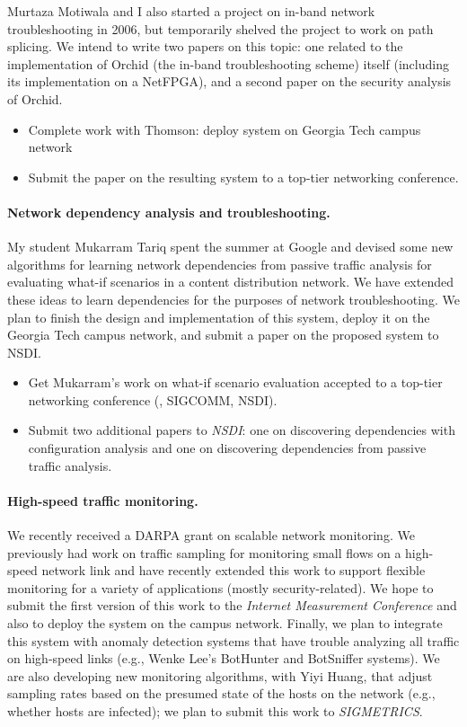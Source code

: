 \begin{sloppypar}
Murtaza Motiwala and I also started a project on in-band network
troubleshooting in 2006, but temporarily shelved the project to work on
path splicing.  We intend to write two papers on this topic: one related
to the implementation of Orchid (the in-band troubleshooting scheme)
itself (including its implementation on a NetFPGA), and a second paper
on the security analysis of Orchid.

\begin{itemize}
\itemsep=-1pt
\item Complete work with Thomson: deploy system on Georgia Tech campus
  network
\item Submit the paper on the resulting system to a top-tier networking
  conference. 
\end{itemize}

\paragraph{Network dependency analysis and troubleshooting.}  My student
Mukarram Tariq spent the summer at Google and devised some new
algorithms for learning network dependencies from passive traffic
analysis for evaluating what-if scenarios in a content distribution
network.  We have extended these ideas to learn dependencies for the
purposes of network troubleshooting.  We plan to finish the design and
implementation of this system, deploy it on the Georgia Tech campus
network, and submit a paper on the proposed system to NSDI.

\begin{itemize}
\itemsep=-1pt
\item Get Mukarram's work on what-if scenario evaluation accepted to a
  top-tier networking conference (\eg, SIGCOMM, NSDI).
\item Submit two additional papers to {\em NSDI}: one on discovering
  dependencies with configuration analysis and one on discovering
  dependencies from passive traffic analysis.
\end{itemize}

\paragraph{High-speed traffic monitoring.} We recently received a DARPA
grant on scalable network monitoring.  We previously had work on traffic
sampling for monitoring small flows on a high-speed network link and
have recently extended this work to support flexible monitoring for a
variety of applications (mostly security-related).  We hope to submit
the first version of this work to the {\em Internet Measurement
Conference} and also to deploy the system on the campus network.
Finally, we plan to integrate this system with anomaly detection systems
that have trouble analyzing all traffic on high-speed links (e.g.,
Wenke Lee's BotHunter and BotSniffer systems).  We are also developing
new monitoring algorithms, with Yiyi Huang, that adjust sampling rates
based on the presumed state of the hosts on the network (e.g., whether
hosts are infected); we plan to submit this work to {\em SIGMETRICS}.


\end{sloppypar}
